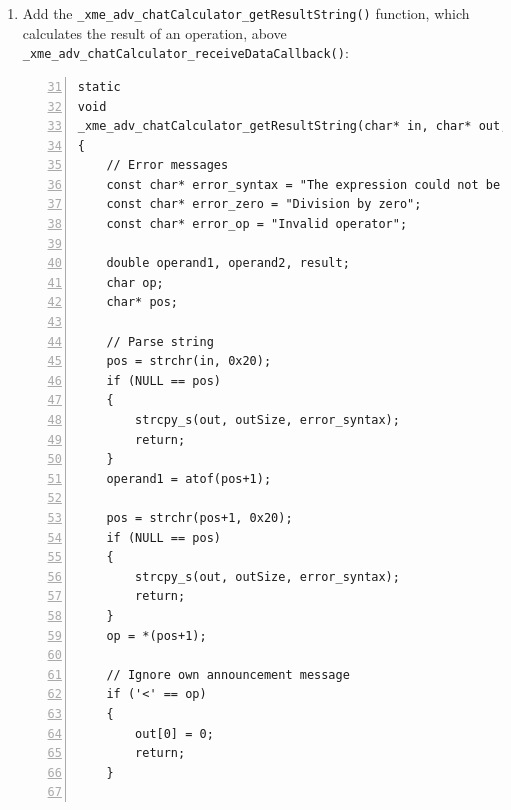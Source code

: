 \begin{enumerate}
\begin{lstlisting}[numbers=left,firstnumber=28]
/*	// TODO: Add code */                    /~~/ Comment or remove this block
//	XME_LOG(XME_LOG_NOTE, "Receive data callback function called!\n");
	
/*	// Example: Print data to screen */     /~~/ Comment or remove this block
//	{
//		const char* message = xme_hal_sharedPtr_getPointer(dataHandle);
//		XME_LOG(XME_LOG_NOTE, "Received: %s\n", message);
//	}

	/~~/ Add all the following lines

	char* input = (char*)xme_hal_sharedPtr_getPointer(dataHandle);
	int size = xme_hal_sharedPtr_getSize(dataHandle);

	// Output data
	char output[512];

	// Sanitize input
	input[size-1] = 0;

	// Strip person's name
	input = strchr(input, ':');
	if (NULL == input)
	{
		// Invalid message format
		return;
	}
	input += 2;

	if (0 != strncmp(input, "!calc ", 6))
	{
		// Not a calculation command
		return;
	}

	_xme_adv_chatCalculator_getResultString
	(
		input, output, sizeof(output)
	);

	if (0 != strlen(output))
	{
		xme_core_dcc_sendTopicData
		(
			config->publicationHandle,
			(void*)output, strlen(output)+1
		);
	}
}
\end{lstlisting}

	\item Add the \verb|_xme_adv_chatCalculator_getResultString()| function, which calculates the result of an operation,
		above \verb|_xme_adv_chatCalculator_receiveDataCallback()|:

\begin{lstlisting}[numbers=left,firstnumber=31]
static
void
_xme_adv_chatCalculator_getResultString(char* in, char* out, int outSize)
{
	// Error messages
	const char* error_syntax = "The expression could not be evaluated";
	const char* error_zero = "Division by zero";
	const char* error_op = "Invalid operator";

	double operand1, operand2, result;
	char op;
	char* pos;

	// Parse string
	pos = strchr(in, 0x20);
	if (NULL == pos)
	{
		strcpy_s(out, outSize, error_syntax);
		return;
	}
	operand1 = atof(pos+1);

	pos = strchr(pos+1, 0x20);
	if (NULL == pos)
	{
		strcpy_s(out, outSize, error_syntax);
		return;
	}
	op = *(pos+1);
	
	// Ignore own announcement message
	if ('<' == op)
	{
		out[0] = 0;
		return;
	}


\end{lstlisting}
\end{enumerate}
